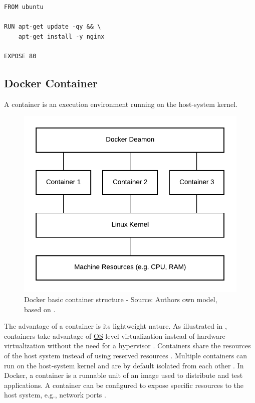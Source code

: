 \begin{lstlisting}[label=lst:04_docker_image_dockerfile, caption=Basic example of a Dockerfile]
FROM ubuntu

RUN apt-get update -qy && \
    apt-get install -y nginx

EXPOSE 80
\end{lstlisting}


\subsection{Docker Container}
A container is an execution environment running on the host-system kernel.

\begin{figure}[h]
\centering
\includegraphics[scale=1]{images/04_technical_background/docker/container_structure}
\caption{Docker basic container structure - Source: Authors own model, based on \cite{Bullington2020Docker}.}
\label{fig:04_docker_container_container-structure}
\end{figure}

The advantage of a container is its lightweight nature. As illustrated in , containers take advantage of \hyperlink{abbr:os}{OS}-level virtualization instead of hardware-virtualization without the need for a hypervisor \cite{Docker2020Docs, Nickoloff2019Docker}. Containers share the resources of the host system instead of using reserved resources \cite{Bullington2020Docker}. Multiple containers can run on the host-system kernel and are by default isolated from each other \cite{Docker2020Docs}.
In Docker, a container is a runnable unit of an image used to distribute and test applications. A container can be configured to expose specific resources to the host system, e.g., network ports \cite{Bullington2020Docker}.


